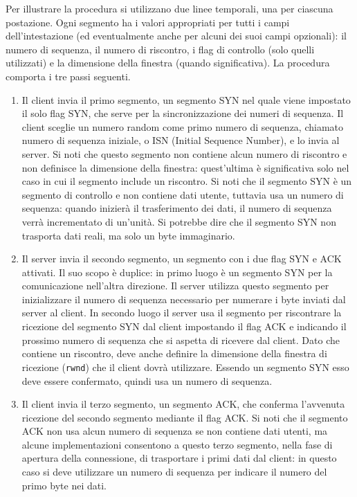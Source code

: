 Per illustrare la procedura si utilizzano due linee temporali, una per ciascuna postazione. Ogni segmento ha i valori appropriati per tutti i campi dell'intestazione (ed eventualmente anche per alcuni dei suoi campi opzionali): il numero di sequenza, il numero di riscontro, i flag di controllo (solo quelli utilizzati) e la dimensione della finestra (quando significativa). La procedura comporta i tre passi seguenti.
\begin{enumerate}
    \item Il client invia il primo segmento, un segmento SYN nel quale viene impostato il solo flag SYN, che serve per la sincronizzazione dei numeri di sequenza. Il client sceglie un numero random come primo numero di sequenza, chiamato numero di sequenza iniziale, o ISN (Initial Sequence Number), e lo invia al server. Si noti che questo segmento non contiene alcun numero di riscontro e non definisce la dimensione della finestra: quest'ultima è significativa solo nel caso in cui il segmento include un riscontro. Si noti che il segmento SYN è un segmento di controllo e non contiene dati utente, tuttavia usa un numero di sequenza: quando inizierà il trasferimento dei dati, il numero di sequenza verrà incrementato di un'unità. Si potrebbe dire che il segmento SYN non trasporta dati reali, ma solo un byte immaginario.

    \item Il server invia il secondo segmento, un segmento con i due flag SYN e ACK attivati. Il suo scopo è duplice: in primo luogo è un segmento SYN per la comunicazione nell'altra direzione. Il server utilizza questo segmento per inizializzare il numero di sequenza necessario per numerare i byte inviati dal server al client. In secondo luogo il server usa il segmento per riscontrare la ricezione del segmento SYN dal client impostando il flag ACK e indicando il prossimo numero di sequenza che si aspetta di ricevere dal client. Dato che contiene un riscontro, deve anche definire la dimensione della finestra di ricezione (\verb|rwnd|) che il client dovrà utilizzare. Essendo un segmento SYN esso deve essere confermato, quindi usa un numero di sequenza.

    \item Il client invia il terzo segmento, un segmento ACK, che conferma l'avvenuta ricezione del secondo segmento mediante il flag ACK. Si noti che il segmento ACK non usa alcun numero di sequenza se non contiene dati utenti, ma alcune implementazioni consentono a questo terzo segmento, nella fase di apertura della connessione, di trasportare i primi dati dal client: in questo caso si deve utilizzare un numero di sequenza per indicare il numero del primo byte nei dati.
\end{enumerate}

